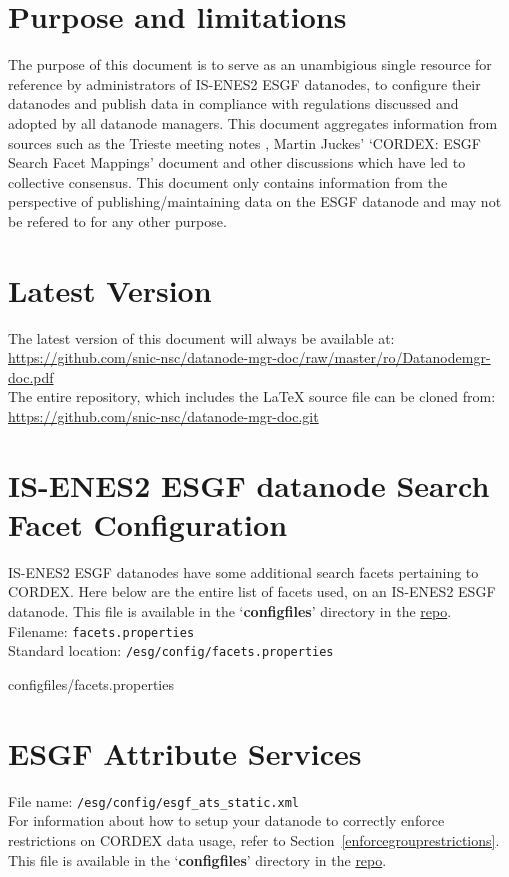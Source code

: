 \section{Purpose and limitations}
The purpose of this document is to serve as an unambigious single resource for reference by administrators of IS-ENES2 ESGF datanodes, to configure their datanodes and publish data in compliance with regulations discussed and adopted by all datanode managers. This document aggregates information from sources such as the Trieste meeting notes \cite{trieste}, Martin Juckes' `CORDEX: ESGF Search Facet Mappings' document \cite{cordexfacetsdoc} and other discussions which have led to collective consensus. This document only contains information from the perspective of publishing/maintaining data on the ESGF datanode and may not be refered to for any other purpose.

\section{Latest Version}
The latest version of this document will always be available at:\\
\url{https://github.com/snic-nsc/datanode-mgr-doc/raw/master/ro/Datanodemgr-doc.pdf} \\
The entire repository, which includes the \LaTeX{} source file can be cloned from:\\
\url{https://github.com/snic-nsc/datanode-mgr-doc.git}


\section{IS-ENES2 ESGF datanode Search Facet Configuration}
IS-ENES2 ESGF datanodes have some additional search facets pertaining to CORDEX. Here below are the entire list of facets used, on an IS-ENES2 ESGF datanode. This file is available in the `\textbf{configfiles}' directory in the \href{https://github.com/snic-nsc/datanode-mgr-doc.git}{repo}. \\
Filename: \texttt{facets.properties}\\
Standard location: \texttt{/esg/config/facets.properties}
\begin{footnotesize}
\begin{verbatimtabinput}[4]{configfiles/facets.properties}
\end{verbatimtabinput}
\end{footnotesize}
\newpage
\section{ESGF Attribute Services}
\label{attribservicesfile}
File name: \texttt{/esg/config/esgf\_ats\_static.xml}\\
For information about how to setup your datanode to correctly enforce restrictions on CORDEX data usage, refer to Section~\ref{enforcegrouprestrictions}. This file is available in the `\textbf{configfiles}' directory in the \href{https://github.com/snic-nsc/datanode-mgr-doc.git}{repo}.

